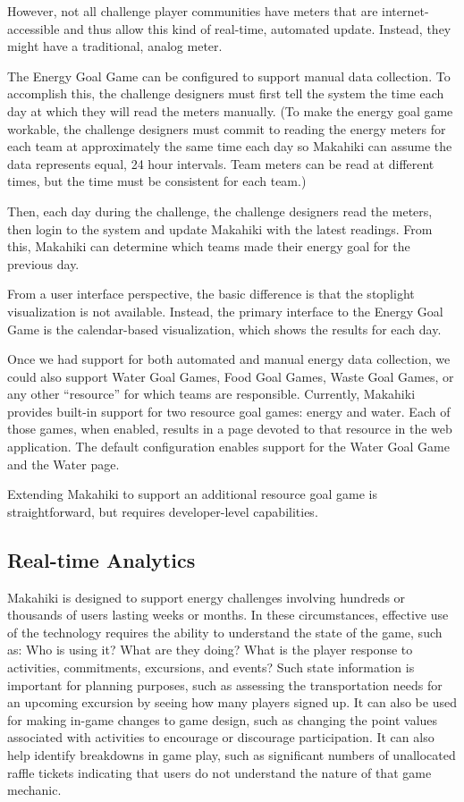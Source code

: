However, not all challenge player communities have meters that are internet-accessible and thus allow this kind of real-time, automated update. Instead, they might have a traditional, analog meter.

The Energy Goal Game can be configured to support manual data collection. To accomplish this, the challenge designers must first tell the system the time each day at which they will read the meters manually. (To make the energy goal game workable, the challenge designers must commit to reading the energy meters for each team at approximately the same time each day so Makahiki can assume the data represents equal, 24 hour intervals. Team meters can be read at different times, but the time must be consistent for each team.)

Then, each day during the challenge, the challenge designers read the meters, then login to the system and update Makahiki with the latest readings. From this, Makahiki can determine which teams made their energy goal for the previous day.

From a user interface perspective, the basic difference is that the stoplight visualization is not available. Instead, the primary interface to the Energy Goal Game is the calendar-based visualization, which shows the results for each day.

Once we had support for both automated and manual energy data collection,  we could also support Water Goal Games, Food Goal Games, Waste Goal Games, or any other ``resource'' for which teams are responsible. Currently, Makahiki provides built-in support for two resource goal games: energy and water. Each of those games, when enabled, results in a page devoted to that resource in the web application. The default configuration enables support for the Water Goal Game and the Water page.

Extending Makahiki to support an additional resource goal game is straightforward, but requires developer-level capabilities.

\subsection{Real-time Analytics}

Makahiki is designed to support energy challenges involving hundreds or thousands of users lasting weeks or months.  In these circumstances, effective use of the technology requires the ability to understand the state of the game, such as: Who is using it? What are they doing? What is the player response to activities, commitments, excursions, and events?   Such state information is important for planning purposes, such as assessing the transportation needs for an upcoming excursion by seeing how many players signed up.   It can also be used for making in-game changes to game design, such as changing the point values associated with activities to encourage or discourage participation.  It can also help identify breakdowns in game play, such as significant numbers of unallocated raffle tickets indicating that users do not understand the nature of that game mechanic.

